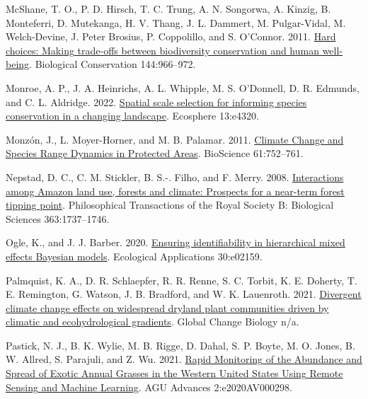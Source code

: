 \documentclass[
  12pt,
]{article}
\newlength{\cslhangindent}
\newlength{\cslentryspacingunit} %
\newenvironment{CSLReferences}[2] %
 {%
  \setlength{\parindent}{0pt}
  \ifodd #1
  \let\oldpar\par
  \def\par{\hangindent=\cslhangindent\oldpar}
  \fi
  \setlength{\parskip}{#2\cslentryspacingunit}
 }%
 {}
\begin{document}
\begin{CSLReferences}{1}{0}
\leavevmode{}%
McShane, T. O., P. D. Hirsch, T. C. Trung, A. N. Songorwa, A. Kinzig, B. Monteferri, D. Mutekanga, H. V. Thang, J. L. Dammert, M. Pulgar-Vidal, M. Welch-Devine, J. Peter Brosius, P. Coppolillo, and S. O'Connor. 2011. \href{https://doi.org/10.1016/j.biocon.2010.04.038}{Hard choices: {Making} trade-offs between biodiversity conservation and human well-being}. Biological Conservation 144:966--972.

\leavevmode{}%
Monroe, A. P., J. A. Heinrichs, A. L. Whipple, M. S. O'Donnell, D. R. Edmunds, and C. L. Aldridge. 2022. \href{https://doi.org/10.1002/ecs2.4320}{Spatial scale selection for informing species conservation in a changing landscape}. Ecosphere 13:e4320.

\leavevmode{}%
Monzón, J., L. Moyer-Horner, and M. B. Palamar. 2011. \href{https://doi.org/10.1525/bio.2011.61.10.5}{Climate {Change} and {Species} {Range} {Dynamics} in {Protected} {Areas}}. BioScience 61:752--761.

\leavevmode{}%
Nepstad, D. C., C. M. Stickler, B. S.-. Filho, and F. Merry. 2008. \href{https://doi.org/10.1098/rstb.2007.0036}{Interactions among {Amazon} land use, forests and climate: Prospects for a near-term forest tipping point}. Philosophical Transactions of the Royal Society B: Biological Sciences 363:1737--1746.

\leavevmode{}%
Ogle, K., and J. J. Barber. 2020. \href{https://doi.org/10.1002/eap.2159}{Ensuring identifiability in hierarchical mixed effects {Bayesian} models}. Ecological Applications 30:e02159.

\leavevmode{}%
Palmquist, K. A., D. R. Schlaepfer, R. R. Renne, S. C. Torbit, K. E. Doherty, T. E. Remington, G. Watson, J. B. Bradford, and W. K. Lauenroth. 2021. \href{https://doi.org/10.1111/gcb.15776}{Divergent climate change effects on widespread dryland plant communities driven by climatic and ecohydrological gradients}. Global Change Biology n/a.

\leavevmode{}%
Pastick, N. J., B. K. Wylie, M. B. Rigge, D. Dahal, S. P. Boyte, M. O. Jones, B. W. Allred, S. Parajuli, and Z. Wu. 2021. \href{https://doi.org/10.1029/2020AV000298}{Rapid {Monitoring} of the {Abundance} and {Spread} of {Exotic} {Annual} {Grasses} in the {Western} {United} {States} {Using} {Remote} {Sensing} and {Machine} {Learning}}. AGU Advances 2:e2020AV000298.


\end{CSLReferences}
\end{document}
